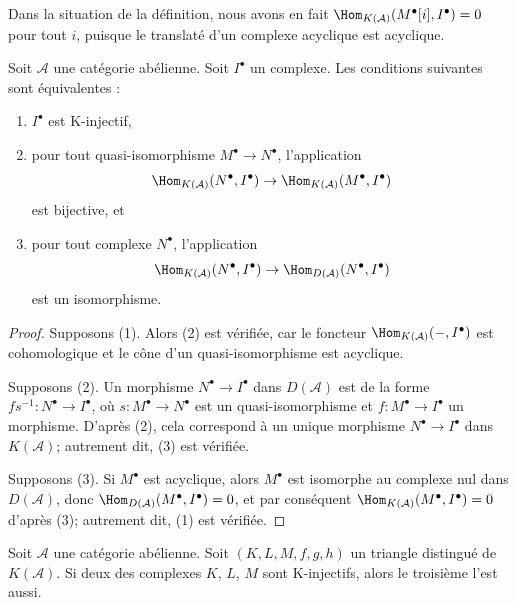 \noindent
Dans la situation de la définition, nous avons en fait
$\Hom_{K(\mathcal{A})}(M^\bullet[i], I^\bullet) = 0$ pour tout $i$, puisque le
translaté d'un complexe acyclique est acyclique.

\begin{lemma}
\label{lemma-K-injective}
Soit $\mathcal{A}$ une catégorie abélienne.
Soit $I^\bullet$ un complexe. Les conditions suivantes sont équivalentes :
\begin{enumerate}
\item $I^\bullet$ est K-injectif,
\item pour tout quasi-isomorphisme $M^\bullet \to N^\bullet$, l'application
$$
\Hom_{K(\mathcal{A})}(N^\bullet, I^\bullet)
\to \Hom_{K(\mathcal{A})}(M^\bullet, I^\bullet)
$$
est bijective, et
\item pour tout complexe $N^\bullet$, l'application
$$
\Hom_{K(\mathcal{A})}(N^\bullet, I^\bullet)
\to \Hom_{D(\mathcal{A})}(N^\bullet, I^\bullet)
$$
est un isomorphisme.
\end{enumerate}
\end{lemma}

\begin{proof}
Supposons (1). Alors (2) est vérifiée, car le foncteur
$\Hom_{K(\mathcal{A})}( - , I^\bullet)$ est cohomologique et le cône d'un
quasi-isomorphisme est acyclique.

\medskip\noindent
Supposons (2). Un morphisme $N^\bullet \to I^\bullet$ dans $D(\mathcal{A})$
est de la forme $fs^{-1} : N^\bullet \to I^\bullet$, où
$s : M^\bullet \to N^\bullet$ est un quasi-isomorphisme et
$f : M^\bullet \to I^\bullet$ un morphisme. D'après (2), cela correspond à un
unique morphisme $N^\bullet \to I^\bullet$ dans $K(\mathcal{A})$;
autrement dit, (3) est vérifiée.

\medskip\noindent
Supposons (3). Si $M^\bullet$ est acyclique, alors $M^\bullet$ est isomorphe
au complexe nul dans $D(\mathcal{A})$, donc
$\Hom_{D(\mathcal{A})}(M^\bullet, I^\bullet) = 0$, et par conséquent
$\Hom_{K(\mathcal{A})}(M^\bullet, I^\bullet) = 0$ d'après (3); autrement dit,
(1) est vérifiée.
\end{proof}

\begin{lemma}
\label{lemma-triangle-K-injective}
Soit $\mathcal{A}$ une catégorie abélienne. Soit $(K, L, M, f, g, h)$ un
triangle distingué de $K(\mathcal{A})$. Si deux des complexes $K$, $L$, $M$
sont K-injectifs, alors le troisième l'est aussi.
\end{lemma}

